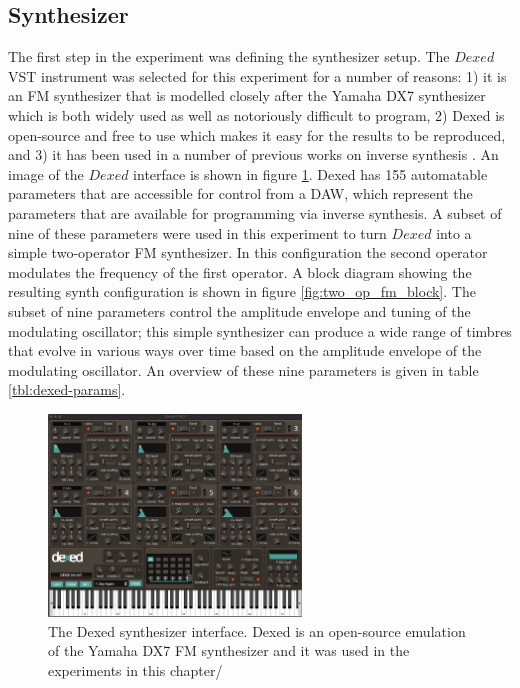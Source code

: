 \subsection{Synthesizer}
The first step in the experiment was defining the synthesizer setup. The $Dexed$ VST instrument was selected for this experiment for a number of reasons: 1) it is an FM synthesizer that is modelled closely after the Yamaha DX7 synthesizer which is both widely used as well as notoriously difficult to program, 2) Dexed is open-source and free to use which makes it easy for the results to be reproduced, and 3) it has been used in a number of previous works on inverse synthesis \cite{yee2018automatic, luke2019stochastic, le2021improving, masudo2021quality}. An image of the $Dexed$ interface is shown in figure \ref{fig:dexed}. Dexed has 155 automatable parameters that are accessible for control from a DAW, which represent the parameters that are available for programming via inverse synthesis. A subset of nine of these parameters were used in this experiment to turn $Dexed$ into a simple two-operator FM synthesizer. In this configuration the second operator modulates the frequency of the first operator. A block diagram showing the resulting synth configuration is shown in figure \ref{fig:two_op_fm_block}. The subset of nine parameters control the amplitude envelope and tuning of the modulating oscillator; this simple synthesizer can produce a wide range of timbres that evolve in various ways over time based on the amplitude envelope of the modulating oscillator. An overview of these nine parameters is given in table \ref{tbl:dexed-params}.

\begin{figure}[ht]
    \centering
    \includegraphics[width=0.6\textwidth]{figures/spiegelib/dexed.png}
    \caption{The Dexed synthesizer interface. Dexed is an open-source emulation of the Yamaha DX7 FM synthesizer and it was used in the experiments in this chapter/}
    \label{fig:dexed}
\end{figure}

